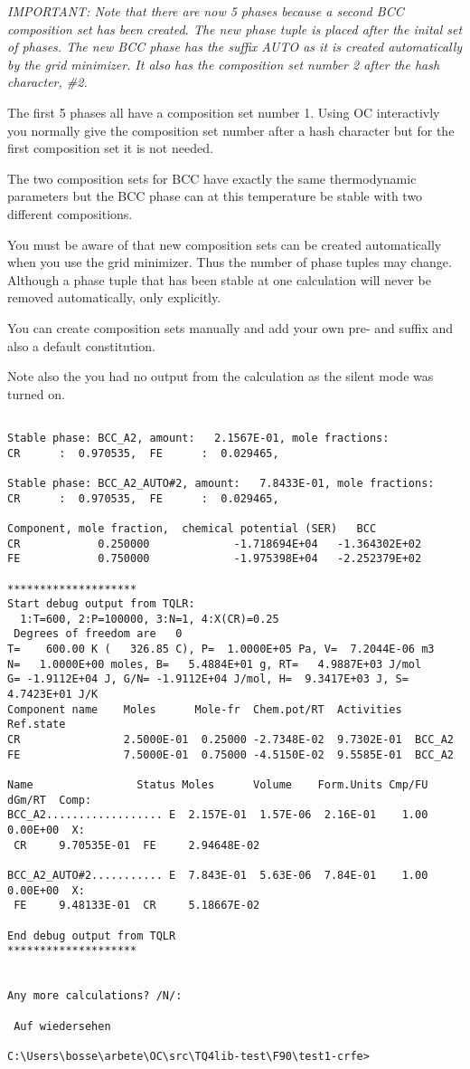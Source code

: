 \documentclass[12pt]{article}
\begin{document}
{\em IMPORTANT: Note that there are now 5 phases because a second BCC
  composition set has been created.  The new phase tuple is placed
  after the inital set of phases.  The new BCC phase has the suffix
  AUTO as it is created automatically by the grid minimizer.  It also
  has the composition set number 2 after the hash character, \#2.

  The first 5 phases all have a composition set number 1.  Using OC
  interactivly you normally give the composition set number after a
  hash character but for the first composition set it is not needed.

  The two composition sets for BCC have exactly the same thermodynamic
  parameters but the BCC phase can at this temperature be stable with
  two different compositions.

  You must be aware of that new composition sets can be created
  automatically when you use the grid minimizer.  Thus the number of
  phase tuples may change.  Although a phase tuple that has been stable
  at one calculation will never be removed automatically, only explicitly.

  You can create composition sets manually and add your own pre- and
  suffix and also a default constitution.

  Note also the you had no output from the calculation as the silent
  mode was turned on.}

{\small
\begin{verbatim}

Stable phase: BCC_A2, amount:   2.1567E-01, mole fractions:
CR      :  0.970535,  FE      :  0.029465,

Stable phase: BCC_A2_AUTO#2, amount:   7.8433E-01, mole fractions:
CR      :  0.970535,  FE      :  0.029465,

Component, mole fraction,  chemical potential (SER)   BCC
CR            0.250000             -1.718694E+04   -1.364302E+02
FE            0.750000             -1.975398E+04   -2.252379E+02

********************
Start debug output from TQLR:
  1:T=600, 2:P=100000, 3:N=1, 4:X(CR)=0.25
 Degrees of freedom are   0
T=    600.00 K (   326.85 C), P=  1.0000E+05 Pa, V=  7.2044E-06 m3
N=   1.0000E+00 moles, B=   5.4884E+01 g, RT=   4.9887E+03 J/mol
G= -1.9112E+04 J, G/N= -1.9112E+04 J/mol, H=  9.3417E+03 J, S=  4.7423E+01 J/K
Component name    Moles      Mole-fr  Chem.pot/RT  Activities  Ref.state
CR                2.5000E-01  0.25000 -2.7348E-02  9.7302E-01  BCC_A2
FE                7.5000E-01  0.75000 -4.5150E-02  9.5585E-01  BCC_A2

Name                Status Moles      Volume    Form.Units Cmp/FU dGm/RT  Comp:
BCC_A2.................. E  2.157E-01  1.57E-06  2.16E-01    1.00  0.00E+00  X:
 CR     9.70535E-01  FE     2.94648E-02

BCC_A2_AUTO#2........... E  7.843E-01  5.63E-06  7.84E-01    1.00  0.00E+00  X:
 FE     9.48133E-01  CR     5.18667E-02

End debug output from TQLR
********************


Any more calculations? /N/:

 Auf wiedersehen

C:\Users\bosse\arbete\OC\src\TQ4lib-test\F90\test1-crfe>
\end{verbatim}
}
\end{document}
